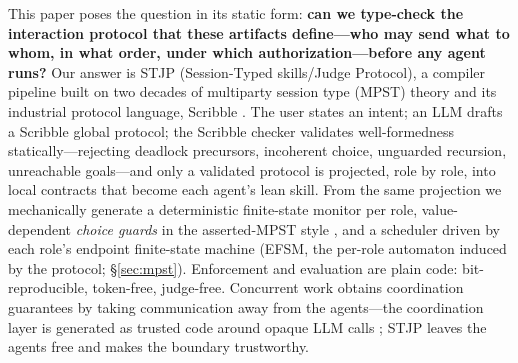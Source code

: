 \documentclass{article}
\newcommand{\stjp}{\textsc{STJP}}
\begin{document}
This paper poses the question in its static form: \textbf{can we type-check the interaction protocol that these artifacts define---who may send what to whom, in what order, under which authorization---before any agent runs?} Our answer is \stjp{} (Session-Typed skills/Judge Protocol), a compiler pipeline built on two decades of multiparty session type (MPST) theory \citep{hyc08,scalas19} and its industrial protocol language, Scribble \citep{scribble}. The user states an intent; an LLM drafts a Scribble global protocol; the Scribble checker validates well-formedness statically---rejecting deadlock precursors, incoherent choice, unguarded recursion, unreachable goals---and only a validated protocol is projected, role by role, into local contracts that become each agent's lean skill. From the same projection we mechanically generate a deterministic finite-state monitor per role, value-dependent \emph{choice guards} in the asserted-MPST style \citep{bocchi10}, and a scheduler driven by each role's endpoint finite-state machine (EFSM, the per-role automaton induced by the protocol; \S\ref{sec:mpst}). Enforcement and evaluation are plain code: bit-reproducible, token-free, judge-free. Concurrent work obtains coordination guarantees by taking communication away from the agents---the coordination layer is generated as trusted code around opaque LLM calls \citep{bollig26}; \stjp{} leaves the agents free and makes the boundary trustworthy.
\end{document}
